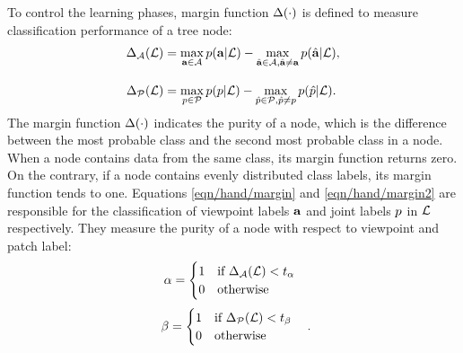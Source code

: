 To control the learning phases, margin function $\Delta(\cdot)$ is defined to measure classification performance of a tree node: 
\begin{align}
	\label{eqn/hand/margin} 
	\Delta_{\mathcal{A}}(\mathcal{L}) & = 
	\max_{\mathbf{a} \in \mathcal{A}} p(\mathbf{a} | \mathcal{L}) - 
	\max_{\hat{\mathbf{a}} \in \mathcal{A}, \hat{\mathbf{a}} \not= \mathbf{a}} p(\hat{\mathbf{a}} | \mathcal{L}), \\[3mm] 
	\label{eqn/hand/margin2} 
	\Delta_{\mathcal{P}}(\mathcal{L}) & = 
	\max_{p \in \mathcal{P}} p(p | \mathcal{L}) - 
	\max_{\hat{p} \in \mathcal{P}, \hat{p} \not= p} p(\hat{p} | \mathcal{L}).
\end{align}
The margin function $\Delta(\cdot)$ indicates the purity of a node, which is the difference between the most probable class and the second most probable class in a node. 
When a node contains data from the same class, its margin function returns zero.
On the contrary, if a node contains evenly distributed class labels, its margin function tends to one.
Equations \ref{eqn/hand/margin} and \ref{eqn/hand/margin2} are responsible for the classification of viewpoint labels $\mathbf{a}$ and joint labels $p$ in $\mathcal{L}$ respectively. They measure the purity of a node with respect to viewpoint and patch label:
\begin{equation}
	\begin{array}{l@{}r}
		\viewparam  = 
		\begin{cases}
			1\mbox{ ~~if } \margin_{\viewlabelset}(\clset) < t_{\viewparam} \\
			0\mbox{ ~~otherwise }
		\end{cases} \\
	\end{array}
	\label{eq:switchparam1}
\end{equation}
\begin{equation}
	\begin{array}{l@{}r}
		\classparam = 
		\begin{cases}
			1\mbox{ ~~if } \margin_{\jointlabelset}(\clset) < t_{\classparam} \\
			0\mbox{ ~~otherwise}
		\end{cases}.
	\end{array}
	\label{eq:switchparam2}
\end{equation}
